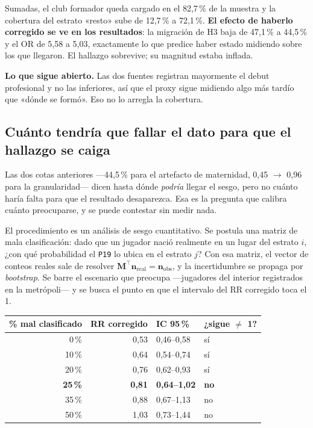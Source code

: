 \documentclass[11pt,a4paper]{article}
\begin{document}
Sumadas, el club formador queda cargado en el 82,7\,\% de la muestra y la
cobertura del estrato «resto» sube de 12,7\,\% a 72,1\,\%. \textbf{El efecto de
haberlo corregido se ve en los resultados}: la migración de H3 baja de 47,1\,\% a
44,5\,\% y el OR de 5,58 a 5,03, exactamente lo que predice haber estado midiendo
sobre los que llegaron. El hallazgo sobrevive; su magnitud estaba inflada.

\textbf{Lo que sigue abierto.} Las dos fuentes registran mayormente el debut
profesional y no las inferiores, así que el proxy sigue midiendo algo más tardío
que «dónde se formó». Eso no lo arregla la cobertura.

\subsection{Cuánto tendría que fallar el dato para que el hallazgo se caiga}
\label{sec:quiebre}

Las dos cotas anteriores —44,5\,\% para el artefacto de maternidad, 0,45
$\rightarrow$ 0,96 para la granularidad— dicen hasta dónde \emph{podría} llegar
el sesgo, pero no cuánto haría falta para que el resultado desaparezca. Esa es
la pregunta que calibra cuánto preocuparse, y se puede contestar sin medir nada.

El procedimiento es un análisis de sesgo cuantitativo. Se postula una matriz de
mala clasificación: dado que un jugador nació realmente en un lugar del estrato
$i$, ¿con qué probabilidad el \texttt{P19} lo ubica en el estrato $j$? Con esa
matriz, el vector de conteos reales sale de resolver
$\mathbf{M}^{\!\top}\mathbf{n}_{\text{real}} = \mathbf{n}_{\text{obs}}$, y la
incertidumbre se propaga por \emph{bootstrap}. Se barre el escenario que
preocupa —jugadores del interior registrados en la metrópoli— y se busca el
punto en que el intervalo del RR corregido toca el 1.

\begin{center}\small
\begin{tabular}{@{}rrll@{}}
\toprule
\textbf{\% mal clasificado} & \textbf{RR corregido} & \textbf{IC 95\,\%} &
\textbf{¿sigue $\neq$ 1?}\\
\midrule
 0\,\% & 0,53 & 0,46--0,58 & sí\\
10\,\% & 0,64 & 0,54--0,74 & sí\\
20\,\% & 0,76 & 0,62--0,93 & sí\\
\textbf{25\,\%} & \textbf{0,81} & \textbf{0,64--1,02} & \textbf{no}\\
35\,\% & 0,88 & 0,67--1,13 & no\\
50\,\% & 1,03 & 0,73--1,44 & no\\
\bottomrule
\end{tabular}
\end{center}
\end{document}
